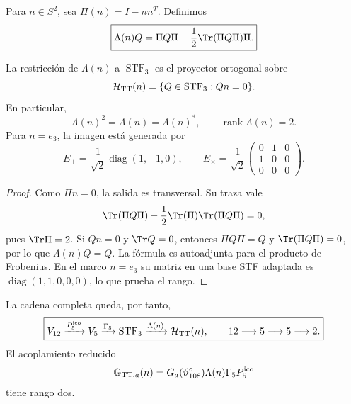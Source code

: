 Para \(n\in S^2\), sea \(\Pi(n)=I-nn^T\). Definimos
\begin{equation}
\label{ii:ii:pent:eq:gravity-lambda-tt}
\boxed{
\Lambda(n)Q
=\Pi Q\Pi-\frac12\Tr(\Pi Q\Pi)\Pi.}
\end{equation}

\begin{theorem}
\label{ii:ii:pent:thm:gravity-tt}
La restricci\'on de \(\Lambda(n)\) a \(\operatorname{STF}_3\) es el
proyector ortogonal sobre
\begin{equation}
\label{ii:ii:pent:eq:gravity-htt}
\mathcal H_{\rm TT}(n)
=\{Q\in\operatorname{STF}_3:Qn=0\}.
\end{equation}
En particular,
\begin{equation}
\label{ii:ii:pent:eq:gravity-lambda-properties}
\Lambda(n)^2=\Lambda(n)=\Lambda(n)^*,
\qquad \operatorname{rank}\Lambda(n)=2.
\end{equation}
Para \(n=e_3\), la imagen est\'a generada por
\begin{equation}
\label{ii:ii:pent:eq:gravity-plus-cross}
E_+=\frac1{\sqrt2}\operatorname{diag}(1,-1,0),
\qquad
E_\times=\frac1{\sqrt2}
\begin{pmatrix}0&1&0\\1&0&0\\0&0&0\end{pmatrix}.
\end{equation}
\end{theorem}

\begin{proof}
Como \(\Pi n=0\), la salida es transversal. Su traza vale
\[
\Tr(\Pi Q\Pi)-\frac12\Tr(\Pi)\Tr(\Pi Q\Pi)=0,
\]
pues \(\Tr\Pi=2\). Si \(Qn=0\) y \(\Tr Q=0\), entonces
\(\Pi Q\Pi=Q\) y \(\Tr(\Pi Q\Pi)=0\), por lo que
\(\Lambda(n)Q=Q\). La f\'ormula es autoadjunta para el producto de
Frobenius. En el marco \(n=e_3\) su matriz en una base STF adaptada es
\(\operatorname{diag}(1,1,0,0,0)\), lo que prueba el rango.
\end{proof}

La cadena completa queda, por tanto,
\begin{equation}
\label{ii:ii:pent:eq:gravity-12-5-5-2}
\boxed{
V_{12}\xrightarrow{P^{\mathrm{ico}}_5}V_5
\xrightarrow{\Gamma_5}\operatorname{STF}_3
\xrightarrow{\Lambda(n)}\mathcal H_{\rm TT}(n),
\qquad 12\longrightarrow5\longrightarrow5\longrightarrow2.}
\end{equation}
El acoplamiento reducido
\begin{equation}
\label{ii:ii:pent:eq:gravity-effective-map}
\mathbb G_{{\rm TT},a}(n)
=G_a(\vartheta^\circ_{108})\Lambda(n)\Gamma_5P^{\mathrm{ico}}_5
\end{equation}
tiene rango dos.


